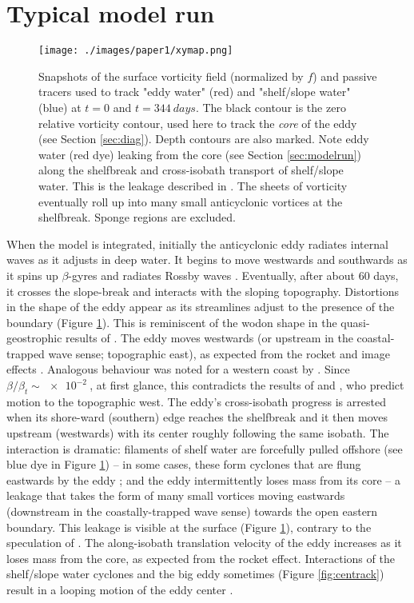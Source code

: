 \section{Typical model run}
\label{sec-3}
\label{sec:modelrun}
\begin{figure}[htb]
\centering
\texttt{[image: ./images/paper1/xymap.png]}
\caption{\label{fig:xyplot}Snapshots of the surface vorticity field (normalized by $f$) and passive tracers used to track "eddy water" (red) and "shelf/slope water" (blue) at $t = 0$ and $t = \SI{344}{days}$. The black contour is the zero relative vorticity contour, used here to track the \emph{core} of the eddy (see Section \ref{sec:diag}). Depth contours are also marked. Note eddy water (red dye) leaking from the core (see Section \ref{sec:modelrun}) along the shelfbreak and cross-isobath transport of shelf/slope water. This is the leakage described in \cite{Shi1993}. The sheets of vorticity eventually roll up into many small anticyclonic vortices at the shelfbreak. Sponge regions are excluded.}
\end{figure}

When the model is integrated, initially  the anticyclonic eddy radiates internal waves as it adjusts in deep water. It begins to move westwards and southwards as it spins up $β$-gyres \citep{Sutyrin1994, Early2011} and radiates Rossby waves \citep{Flierl1984, Flierl1994, Chassignet1991, Jacob2002}. Eventually, after about 60 days, it crosses the slope-break and interacts with the sloping topography. Distortions in the shape of the eddy appear as its streamlines adjust to the presence of the boundary (Figure \ref{fig:xyplot}). This is reminiscent of the wodon shape in the quasi-geostrophic results of \citet{Shi1994}. The eddy moves westwards (or upstream in the coastal-trapped wave sense; topographic east), as expected from the rocket and image effects \citep{Nof1999}. Analogous behaviour was noted for a western coast by \cite{Wei2009}. Since $β/β_t \sim \SI{e-2}{}$, at first glance, this contradicts the results of \citet{Jacob2002} and \citet{Smith1983}, who predict motion to the topographic west. The eddy's cross-isobath progress is arrested when its shore-ward (southern) edge reaches the shelfbreak and it then moves upstream (westwards) with its center roughly following the same isobath. The interaction is dramatic: filaments of shelf water are forcefully pulled offshore (see blue dye in Figure \ref{fig:xyplot}) -- in some cases, these form cyclones that are flung eastwards by the eddy \citep[also described by][]{Wang1992, Sutyrin2003, Oey2004, Wei2009} ; and the eddy intermittently loses mass from its core -- a leakage \citep{Shi1993, Nof1999, Wei2009} that takes the form of many small vortices moving eastwards (downstream in the coastally-trapped wave sense) towards the open eastern boundary. This leakage is visible at the surface (Figure \ref{fig:xyplot}), contrary to the speculation of \citet{Nof1999}. The along-isobath translation velocity of the eddy increases as it loses mass from the core, as expected from the rocket effect. Interactions of the shelf/slope water cyclones and the big eddy sometimes (Figure \ref{fig:centrack}) result in a looping motion of the eddy center \citep[see also ][]{Frolov2004, Sutyrin2010}.

